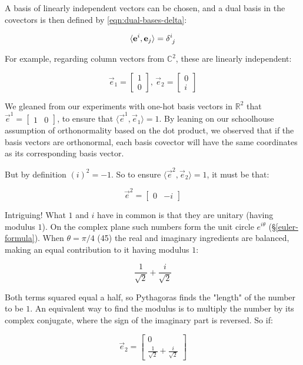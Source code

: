 A basis of linearly independent vectors can be chosen, and a dual basis in the covectors is then defined by \eqref{eqn:dual-bases-delta}:

$$
\langle \vec{e}^i,\vec{e}_j\rangle = \delta\indices{^i_j}
$$  

For example, regarding column vectors from $\mathbb{C}^2$, these are linearly independent:

$$
\vec{e}_1 = \begin{bmatrix}1 \\ 0\end{bmatrix}
, \,
\vec{e}_2 = \begin{bmatrix}0 \\ i\end{bmatrix}
$$

We gleaned from our experiments with one-hot basis vectors in $\mathbb{R}^2$ that $\vec{e}^1 = \begin{bmatrix}1 & 0\end{bmatrix}$, to ensure that $\langle \vec{e}^1,\vec{e}_1\rangle = 1$. By leaning on our schoolhouse assumption of orthonormality based on the dot product, we observed that if the basis vectors are orthonormal, each basis covector will have the same coordinates as its corresponding basis vector.

But by definition $(i)^2 = -1$. So to ensure $\langle \vec{e}^2,\vec{e}_2\rangle = 1$, it must be that:

$$
\vec{e}^2 = \begin{bmatrix}0 & -i\end{bmatrix}
$$

Intriguing! What $1$ and $i$ have in common is that they are unitary (having modulus $1$). On the complex plane such numbers form the unit circle $e^{i\theta}$ (§\ref{euler-formula}). When $\theta = \pi / 4$ (45\textdegree) the real and imaginary ingredients are balanced, making an equal contribution to it having modulus $1$:

$$
\frac{1}{\sqrt{2}} + \frac{i}{\sqrt{2}}
$$

Both terms squared equal a half, so Pythagoras finds the "length" of the number to be $1$. An equivalent way to find the modulus is to multiply the number by its complex conjugate, where the sign of the imaginary part is reversed. So if:

$$
\vec{e}_2 = \begin{bmatrix}0 \\ \frac{1}{\sqrt{2}} + \frac{i}{\sqrt{2}}\end{bmatrix}
$$

